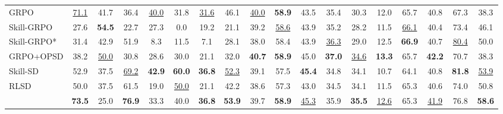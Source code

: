 \begin{table}[t]
{\begin{tabular}{l CCCCCCC CCCCCCCC CC }
    GRPO
        & \underline{71.1} & 41.7 & 36.4 & \underline{40.0} & 31.8 & \underline{31.6} & 46.1
        & \underline{40.0} & \textbf{58.9} & 43.5 & 35.4 & 30.3 & 12.0 & 65.7 & 40.8
        & 67.3 & 38.3
        \\
    Skill-GRPO
        & 27.6 & \textbf{54.5} & 22.7 & 27.3 & 0.0 & 19.2 & 21.1
        & 39.2 & \underline{58.6} & 43.9 & 35.2 & 28.2 & 11.5 & \underline{66.1} & 40.4
        & 73.4 & 46.1
        \\
    Skill-GRPO*
        & 31.4 & 42.9 & 51.9 & 8.3 & 11.5 & 7.1 & 28.1
        & 38.0 & 58.4 & 43.9 & \underline{36.3} & 29.0 & 12.5 & \textbf{66.9} & 40.7
        & \underline{80.4} & 50.0
        \\
    GRPO+OPSD
        & 38.2 & \underline{50.0} & 30.8 & 28.6 & 30.0 & 21.1 & 32.0
        & \textbf{40.7} & \textbf{58.9} & 45.0 & \textbf{37.0} & \underline{34.6} & \textbf{13.3} & 65.7 & \textbf{42.2}
        & 70.7 & 38.3
        \\
    Skill-SD
        & 52.9 & 37.5 & \underline{69.2} & \textbf{42.9} & \textbf{60.0} & \textbf{36.8} & \underline{52.3}
        & 39.1 & 57.5 & \textbf{45.4} & 34.8 & 34.1 & 10.7 & 64.1 & 40.8
        & \textbf{81.8} & \underline{53.9}
        \\
    RLSD
        & 50.0 & 37.5 & 61.5 & 19.0 & \underline{50.0} & 21.1 & 42.2
        & 38.6 & 57.3 & 43.0 & 34.5 & 34.1 & 11.5 & 65.3 & 40.6
        & 74.0 & 50.8
        \\
    \textbf{\methodname{}}
        & \textbf{73.5} & 25.0 & \textbf{76.9} & 33.3 & 40.0 & \textbf{36.8} & \textbf{53.9}
        & 39.7 & \textbf{58.9} & \underline{45.3} & 35.9 & \textbf{35.5} & \underline{12.6} & 65.3 & \underline{41.9}
        & 76.8 & \textbf{58.6}
        \\

    \bottomrule
    \end{tabular}
    }
    \end{table}